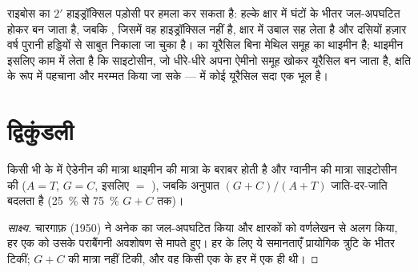 \begin{example}\label{ex:b1:nucleic-acids:fragile}
राइबोस का $2'$ हाइड्रॉक्सिल पड़ोसी  पर हमला कर सकता
है: हल्के क्षार में  घंटों के भीतर जल-अपघटित होकर  बन
जाता है, जबकि , जिसमें वह हाइड्रॉक्सिल नहीं है, क्षार में उबाल सह लेता
है और दसियों हज़ार वर्ष पुरानी हड्डियों से साबुत निकाला जा चुका है। 
का यूरैसिल बिना मेथिल समूह का थाइमीन है;  थाइमीन इसलिए काम में लेता है
कि साइटोसीन, जो धीरे-धीरे अपना ऐमीनो समूह खोकर यूरैसिल बन जाता है, क्षति
के रूप में पहचाना और मरम्मत किया जा सके ---  में कोई यूरैसिल सदा एक
भूल है।
\end{example}

\section{द्विकुंडली}

\begin{proposition}[चारगाफ़ के नियम]\label{prop:b1:nucleic-acids:chargaff}
किसी भी  के  में ऐडेनीन की मात्रा थाइमीन की मात्रा के बराबर होती
है और ग्वानीन की मात्रा साइटोसीन की ($A = T$,
$G = C$, इसलिए  $=$ ), जबकि अनुपात $(G + C)/(A + T)$
जाति-दर-जाति बदलता है (\qty{25}{\%} से \qty{75}{\%}
$G + C$ तक)।
\end{proposition}
\begin{proof}[साक्ष्य]
चारगाफ़ (1950) ने अनेक  का  जल-अपघटित किया और क्षारकों को
वर्णलेखन से अलग किया, हर एक को उसके पराबैंगनी अवशोषण से मापते हुए।
हर  के लिए ये समानताएँ प्रायोगिक त्रुटि के भीतर टिकीं;
$G + C$ की मात्रा नहीं टिकी, और वह किसी एक  के हर  में एक ही थी।
\end{proof}


